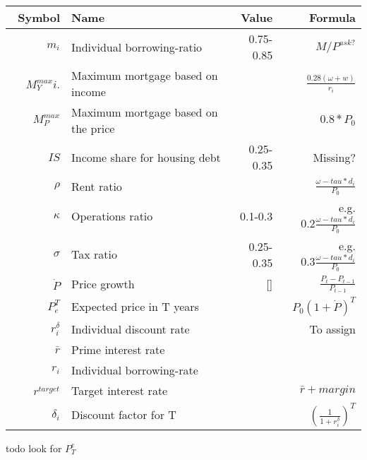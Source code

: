 \renewcommand{\arraystretch}{1.5}
\begin{tabular}{rlrr}\
Symbol         & Name                                 & Value      & Formula  \\ \hline
$m_i$          & Individual borrowing-ratio           & 0.75-0.85  & $M/P^{ask?}$ \\
$M^{max}_Yi$.  & Maximum mortgage based on income     &            & $\frac{0.28(\omega+w)}{r_i}$ \\
 $M^{max}_P$   & Maximum mortgage based on the price  &            & $0.8*P_0$ \\
$IS$           & Income share for housing debt        & 0.25-0.35  & Missing? \\
$\rho$         & Rent ratio                           &            & $\frac{\omega-tau*d_i}{P_0}$ \\
$\kappa $      & Operations ratio                     & 0.1-0.3    & e.g. $ 0.2\frac{\omega-tau*d_i}{P_0}$ \\
$\sigma$       & Tax ratio                            & 0.25-0.35  & e.g. $ 0.3\frac{\omega-tau*d_i}{P_0}$ \\
$\dot P $      & Price growth                         & []         & $\frac{P_t-P_{t-1}}{P_{t-1}}$\\
$P^T_e$        & Expected price in T years            &            & $P_0(1+\dot P)^T$ \\ %
$r_i^\delta$   & Individual discount rate             &            & To assign \\
$\bar r$       & Prime interest rate                  &            & \\
$r_i$          & Individual borrowing-rate            &            & \\
$r^{target}$   & Target interest rate                 &            & $\bar r + margin$ \\
$\delta_i$     & Discount factor for T                &            & $\left(\frac{1}{1+r_i^\delta}\right)^T$ \\
\end{tabular}
\renewcommand{\arraystretch}{1.0}


todo look for $P^e_T$ 

  
    
    

